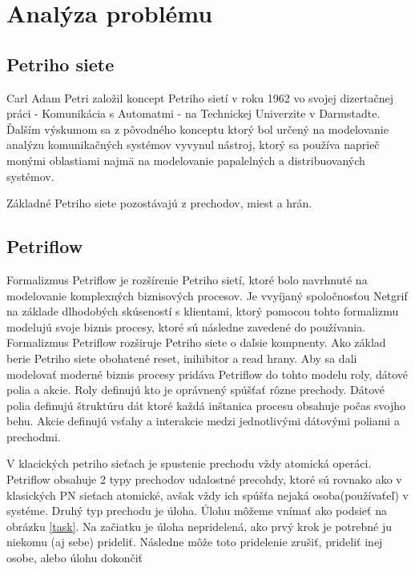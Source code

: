  


\section{Analýza problému} 

  

\subsection{Petriho siete} %

 Carl Adam Petri založil koncept Petriho sietí v roku 1962 vo svojej dizertačnej práci - Komunikácia s Automatmi - na Technickej Univerzite v Darmstadte. Ďalším výskumom sa z pôvodného konceptu ktorý bol určený na modelovanie analýzu komunikačných systémov vyvynul nástroj, ktorý sa používa naprieč monými oblastiami najmä na modelovanie papalelných a distribuovaných systémov. 
 
 Základné Petriho siete pozostávajú z prechodov, miest a hrán. 
  
\subsection{Petriflow} %
\cite{petriflow_clanok}
Formalizmus Petriflow je rozšírenie Petriho sietí, ktoré bolo navrhnuté na modelovanie komplexných biznisových procesov. Je vvyíjaný spoločnosťou Netgrif na základe dlhodobých skúseností s klientami, ktorý pomocou tohto formalizmu modelujú svoje biznis procesy, ktoré sú následne zavedené do používania. 
Formalizmus Petriflow rozširuje Petriho siete o daľsie kompnenty. Ako základ berie Petriho siete obohatené reset, inihibitor a read hrany. Aby sa dali modelovať moderné biznis procesy pridáva Petriflow do tohto modelu roly, dátové polia a akcie. 
Roly definujú kto je oprávnený spúšťať rôzne prechody. 
Dátové polia definujú štruktúru dát ktoré každá inštanica procesu obsahuje počas svojho behu.
Akcie definujú vsťahy a interakcie medzi jednotlivými dátovými poliami a prechodmi.

V klacických petriho sieťach je spustenie prechodu vždy atomická operáci. Petriflow obsahuje 2 typy prechodov udalostné precohdy, ktoré sú rovnako  ako v klasických PN sieťach atomické, avšak vždy ich spúšťa nejaká osoba(používaťeľ) v systéme. Druhý typ prechodu je úloha. Úlohu môžeme vnímať ako podsieť na obrázku \ref{task}. Na začiatku je úloha nepridelená, ako prvý krok je potrebné ju niekomu (aj sebe) prideliť. Následne môže toto pridelenie zrušiť, prideliť inej osobe, alebo úlohu dokončiť


